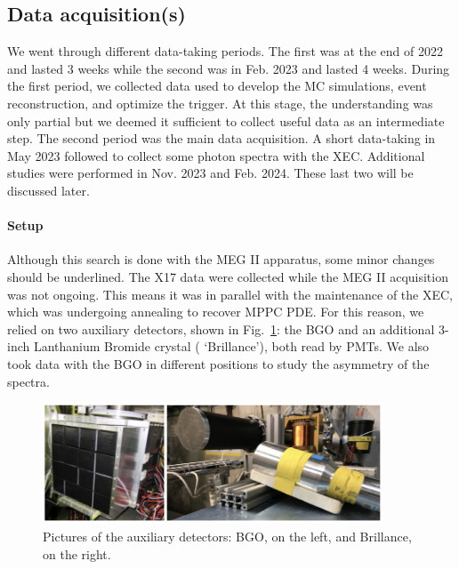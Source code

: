 \begin{refsection}
    \subsection{Data acquisition(s)}
        We went through different data-taking periods. 
        The first was at the end of 2022 and lasted 3 weeks while the second was in Feb. 2023 and lasted 4 weeks.
        During the first period, we collected data used to develop the MC simulations, event reconstruction, and optimize the trigger.
        At this stage, the understanding was only partial but we deemed it sufficient to collect useful data as an intermediate step.
        The second period was the main data acquisition. 
        A short data-taking in May 2023 followed to collect some photon spectra with the XEC.
        Additional studies were performed in Nov. 2023 and Feb. 2024.
        These last two will be discussed later.

        \paragraph{Setup} Although this search is done with the MEG II apparatus, some minor changes should be underlined.
        The X17 data were collected while the MEG II acquisition was not ongoing. This means it was in parallel with the maintenance of the XEC, which was undergoing annealing to recover MPPC PDE.
        For this reason, we relied on two auxiliary detectors, shown in Fig.~\ref{fig:X17:Brillance}: the BGO and an additional 3-inch Lanthanium Bromide crystal ( `Brillance'), both read by PMTs.
        We also took data with the BGO in different positions to study the asymmetry of the spectra.

        \begin{figure}
            \centering
            \includegraphics[width = 0.9\textwidth]{Figures/X17/BGOandBrillance.png}
            \caption[X17: Auxiliarly detecotrs]{Pictures of the auxiliary detectors: BGO, on the left, and Brillance, on the right.}
            \label{fig:X17:Brillance}
        \end{figure}
        

\end{refsection}
